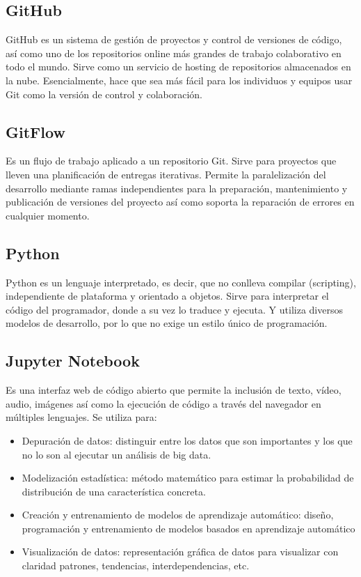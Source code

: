 \documentclass[12pt,letterpaper]{article}
\begin{document}
\subsection*{GitHub}
GitHub es un sistema de gestión de proyectos y control de versiones de código,
así como uno de los repositorios online más grandes de trabajo colaborativo en
todo el mundo.
\citep{hostinger_tutoriales_2019}
Sirve como un servicio de hosting de repositorios almacenados en la nube.
Esencialmente, hace que sea más fácil para los individuos y equipos usar Git
como la versión de control y colaboración.
\citep{kinsta_2020}

\subsection*{GitFlow}
Es un flujo de trabajo aplicado a un repositorio Git. Sirve para proyectos que
lleven una planificación de entregas iterativas. Permite la paralelización del
desarrollo mediante ramas independientes para la preparación, mantenimiento y
publicación de versiones del proyecto así como soporta la reparación de errores
en cualquier momento.
\citep{claventy_2020}

\subsection*{Python}
Python es un lenguaje interpretado, es decir, que no conlleva compilar
(scripting), independiente de plataforma y orientado a objetos. 
\citep{desarrollo_web_2003}
Sirve para interpretar el código del programador, donde a su vez lo traduce y
ejecuta. Y utiliza diversos modelos de desarrollo, por lo que no exige un estilo
único de programación.
\citep{angeles_2020}

\subsection*{Jupyter Notebook}
Es una interfaz web de código abierto que permite la inclusión de texto, vídeo,
audio, imágenes así como la ejecución de código a través del navegador en
múltiples lenguajes. 
\citep{cabrera_diaz_jupyter}
Se utiliza para: 
\begin{itemize}
\item Depuración de datos: distinguir entre los datos que son importantes y los
que no lo son al ejecutar un análisis de big data.
\item Modelización estadística: método matemático para estimar la probabilidad
de distribución de una característica concreta.
\item Creación y entrenamiento de modelos de aprendizaje automático: diseño,
programación y entrenamiento de modelos basados en aprendizaje automático
\item Visualización de datos: representación gráfica de datos para visualizar
con claridad patrones, tendencias, interdependencias, etc.
\citep{digital_guide_ionos_jupyter}
\end{itemize}
\end{document}
